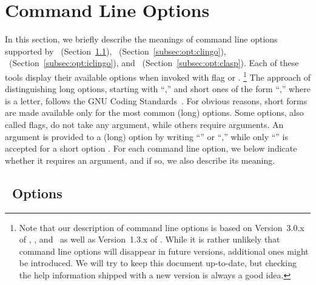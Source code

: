 \section{Command Line Options}\label{sec:options}

In this section, we briefly describe the meanings of
command line options supported by
\gringo\ (Section~\ref{subsec:opt:gringo}),
\clingo\ (Section~\ref{subsec:opt:clingo}),
\iclingo\ (Section~\ref{subsec:opt:iclingo}), and
\clasp\ (Section~\ref{subsec:opt:clasp}).
Each of these tools display their available options
when invoked with flag  or .%
\footnote{%
  Note that our description of command line options
  is based on Version~3.0.x of \gringo, \clingo, and \iclingo\
  as well as Version~1.3.x of \clasp.
  While it is rather unlikely that command line options will
  disappear in future versions,
  additional ones might be introduced.
  We will try to keep this document up-to-date,
  but checking the help information shipped 
  with a new version is always a good idea.}
The approach of distinguishing long options, starting with ``\code{--},''
and short ones of the form ``\code{-\textit{l}},''
where  is a letter,
follows the GNU Coding Standards~\cite{GNUcoding}.
For obvious reasons,
short forms are made available only for the most common (long) options.
Some options, also called flags, do not take any argument,
while others require arguments.
An argument  is provided to a (long) option 
by writing 
``'' or
``,''
while only
``''
is accepted for a short option .
For each command line option,
we below indicate whether it requires an argument,
and if so, we also describe its meaning.


\subsection{\gringo\ Options}\label{subsec:opt:gringo}


